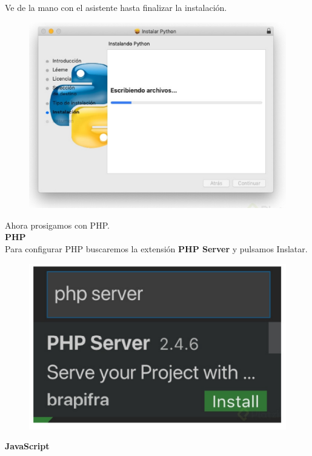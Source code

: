\documentclass{article}
\begin{document}
Ve de la mano con el asistente hasta finalizar la instalación.

\begin{figure}[h!]
  \centering
  \includegraphics[scale=0.75]{./Pictures/027_python.png}
\end{figure}


Ahora prosigamos con PHP.\\

\newpage
\textbf{PHP}\\

Para configurar PHP buscaremos la extensión \textbf{PHP Server} y pulsamos Inslatar.

\begin{figure}[h!]
  \centering
  \includegraphics[scale=0.35]{./Pictures/028_php_server.png}
\end{figure}

\textbf{JavaScript}\\
\end{document}
